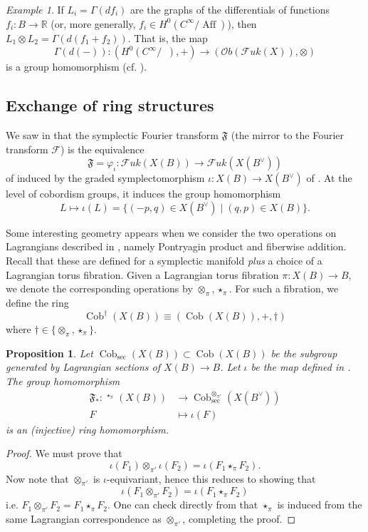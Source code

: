 \documentclass[10pt]{amsart}
\newtheorem{prop}[thm]{Proposition}
\theoremstyle{definition}
\theoremstyle{remark}
\newtheorem{example}[thm]{Example}
\def\R{\mathbb{R}}
\def\Z{\mathbb{Z}}
\DeclareMathOperator{\Aff}{Aff}
\DeclareMathOperator{\AffZ}{\Aff_{\Z}}
\DeclareMathOperator{\Cob}{Cob}
\DeclareMathOperator{\Cobfib}{\mathrm{Cob}_{\mathrm{fib}}}
\newcommand{\mcal}{\mathcal}
\begin{document}
\begin{example}
    If $L_i = \Gamma(df_i)$ are the graphs of the differentials of functions $f_i: B \to \R$ (or, more generally, $f_i \in H^0(C^\infty/\Aff)$), then $L_1\otimes L_2 = \Gamma(d(f_1 +f_2))$.
    That is, the map
    $$
    \Gamma(d(-)): (H^0(C^\infty /\AffZ),+) \to (\mcal Ob(\mcal Fuk(X)),\otimes)
    $$
    is a group homomorphism (cf. ).
\end{example}

 
\subsection{Exchange of ring structures}\label{sec:exchange}
We saw in  that the symplectic Fourier transform $\mathfrak F$ (the mirror to the Fourier transform $\mcal F$) is the equivalence 
$$
\mathfrak F = \varphi_\iota : \mcal Fuk(X(B)) \to \mcal Fuk(X(B^\vee))
$$ 
of  induced by the graded symplectomorphism $\iota:X(B) \to X(B^\vee)$ of .
At the level of  cobordism groups, it induces the group homomorphism 
$$
L \mapsto \iota(L) =  \{(-p,q) \in X(B^\vee) \mid (q,p) \in X(B)\}.
$$

Some interesting geometry appears when we consider the two operations on Lagrangians described in , namely Pontryagin product and fiberwise addition.
Recall that these are defined for a symplectic manifold \emph{plus} a choice of a Lagrangian torus fibration.
Given a Lagrangian torus fibration $\pi: X(B) \to B$, we denote the corresponding operations by $\otimes_\pi,\star_\pi$.
For such a fibration, we define the ring
$$
\Cob^{\dagger}(X(B)) \equiv (\Cob(X(B)), +, \dagger)
$$
where $\dagger \in \{\otimes_\pi,\star_\pi\}$.
\begin{prop}\label{prop:exchangeoncob}
    Let $\Cob_{\text{sec}}(X(B)) \subset \Cob(X(B))$ be the subgroup generated by Lagrangian sections of $X(B) \to B$.
    Let $\iota$ be the map defined in .
    The group homomorphism
    \begin{align*}
        \mathfrak F_*:\Cobfib^{\star_\pi}(X(B)) &\to \Cob_{\text{sec}}^{\otimes_{\pi'}}(X(B^\vee)) \\
        F & \mapsto \iota(F)
    \end{align*}
    is an (injective) ring homomorphism.
\end{prop}
\begin{proof}
    We must prove that
    $$
    \iota(F_1) \otimes_{\pi'} \iota(F_2) = \iota(F_1 \star_\pi F_2).
    $$
    Now note that $\otimes_{\pi'}$ is $\iota$-equivariant, hence this reduces to showing that 
    $$
    \iota(F_1 \otimes_{\pi'} F_2) = \iota(F_1 \star_\pi F_2)
    $$
    i.e. $F_1 \otimes_{\pi'} F_2 = F_1 \star_\pi F_2$.
    One can check directly from  that $\star_\pi$ is induced from the same Lagrangian correspondence as $\otimes_{\pi'}$, completing the proof.
\end{proof}
\end{document}
